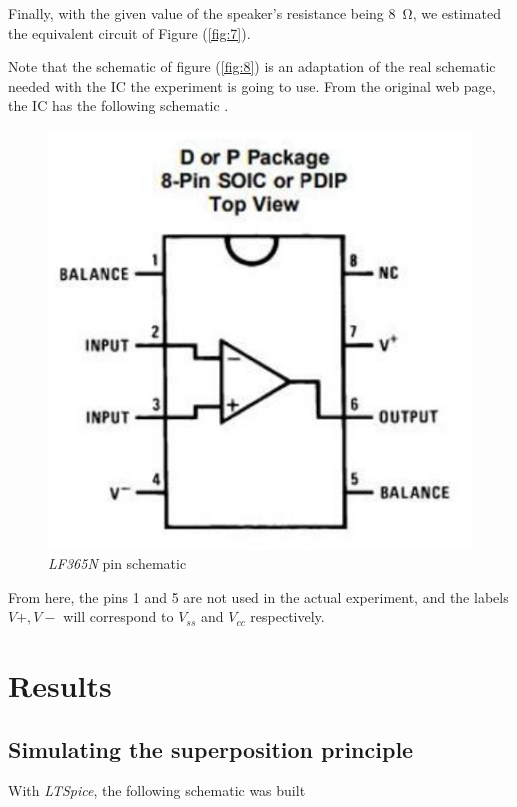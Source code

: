 \documentclass[english,12pt]{article}
\begin{document}
Finally, with the given value of the speaker's resistance being \SI{8}{\ohm}, we estimated the equivalent circuit of Figure (\ref{fig:7}).

Note that the schematic of figure (\ref{fig:8}) is an adaptation of the real schematic needed with the IC the experiment is going to use. From the original web page, the IC has the following schematic \parencite[11]{manual}.

\begin{figure}[h]
    \centering
    \includegraphics[scale=0.33]{pinout.png}
    \caption{\textit{LF365N} pin schematic }
    \label{fig:91}
\end{figure}

From here, the pins 1 and 5 are not used in the actual experiment, and the labels $V+,V-$ will correspond to $V_{ss}$ and $V_{cc}$ respectively.

\section{Results}

\subsection{Simulating the superposition principle}

With \textit{LTSpice}, the following schematic was built
\end{document}
